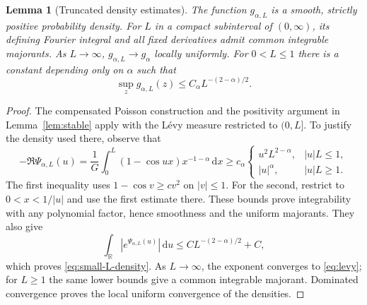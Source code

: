 \documentclass[11pt,a4paper]{article}
\numberwithin{equation}{section}
\newtheorem{lemma}[theorem]{Lemma}
\theoremstyle{definition}
\theoremstyle{remark}
\newcommand{\R}{\mathbb R}
\newcommand{\dd}{\,\mathrm d}
\begin{document}
\begin{lemma}[Truncated density estimates]
\label{lem:truncated-density}
The function $g_{\alpha,L}$ is a smooth, strictly positive probability
density. For $L$ in a compact subinterval of $(0,\infty)$, its defining
Fourier integral and all fixed derivatives admit common integrable
majorants. As $L\to\infty$, $g_{\alpha,L}\to g_\alpha$ locally uniformly.
For $0<L\le1$ there is a constant depending only on $\alpha$ such that
\begin{equation}\label{eq:small-L-density}
 \sup_z g_{\alpha,L}(z)\le C_\alpha L^{-(2-\alpha)/2}.
\end{equation}
\end{lemma}
\begin{proof}
The compensated Poisson construction and the positivity argument in
Lemma~\ref{lem:stable} apply with the L\'evy measure restricted to $(0,L]$.
To justify the density used there, observe that
\[
 -\Re\Psi_{\alpha,L}(u)
   =\frac1G\int_0^L(1-\cos ux)x^{-1-\alpha}\dd x
 \ge c_\alpha
 \begin{cases}
 u^2L^{2-\alpha},& |u|L\le1,\\
 |u|^\alpha,& |u|L\ge1.
 \end{cases}
\]
The first inequality uses $1-\cos v\ge c v^2$ on $|v|\le1$.
For the second, restrict to $0<x<1/|u|$ and use the first estimate there.
These bounds prove integrability with any polynomial factor, hence
smoothness and the uniform majorants. They also give
\[
 \int_\R |e^{\Psi_{\alpha,L}(u)}|\dd u
 \le C L^{-(2-\alpha)/2}+C,
\]
which proves \eqref{eq:small-L-density}. As $L\to\infty$, the exponent
converges to \eqref{eq:levy}; for $L\ge1$ the same lower bounds give a
common integrable majorant. Dominated convergence proves the local
uniform convergence of the densities.
\end{proof}
\end{document}
